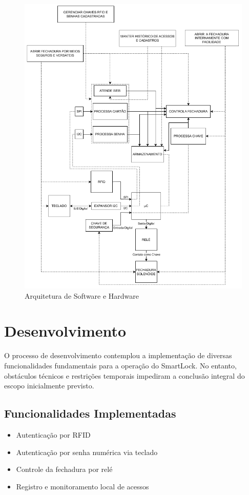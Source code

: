 \documentclass{article}
\begin{document}
\begin{figure}[H]
    \centering
    \includegraphics[width=\textwidth]{./images/arquitetura_swhw.png}
    \caption{Arquitetura de Software e Hardware}
    \label{fig:arquitetura_swhw}
\end{figure}

\section*{Desenvolvimento}
O processo de desenvolvimento contemplou a implementação de diversas funcionalidades fundamentais para a operação do SmartLock. No entanto, obstáculos técnicos e restrições temporais impediram a conclusão integral do escopo inicialmente previsto.

\subsection*{Funcionalidades Implementadas}
\begin{itemize}
    \item Autenticação por RFID
    \item Autenticação por senha numérica via teclado
    \item Controle da fechadura por relé
    \item Registro e monitoramento local de acessos
\end{itemize}
\end{document}
